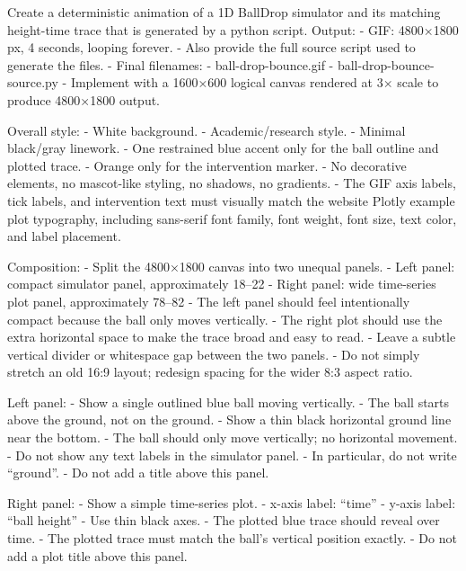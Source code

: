 \documentclass[11pt]{article}
\begin{document}
\begin{DocCode}
Create a deterministic animation of a 1D BallDrop simulator and its matching height-time trace that is generated by a python script.
 Output:
  - GIF: 4800×1800 px, 4 seconds, looping forever.
  - Also provide the full source script used to generate the files.
  - Final filenames:
    - ball-drop-bounce.gif
    - ball-drop-bounce-source.py
  - Implement with a 1600×600 logical canvas rendered at 3× scale to produce 4800×1800 output.

  Overall style:
  - White background.
  - Academic/research style.
  - Minimal black/gray linework.
  - One restrained blue accent only for the ball outline and plotted trace.
  - Orange only for the intervention marker.
  - No decorative elements, no mascot-like styling, no shadows, no gradients.
  - The GIF axis labels, tick labels, and intervention text must visually match the website
    Plotly example plot typography, including sans-serif font family, font weight, font size,
    text color, and label placement.

  Composition:
  - Split the 4800×1800 canvas into two unequal panels.
  - Left panel: compact simulator panel, approximately 18–22%
  - Right panel: wide time-series plot panel, approximately 78–82%
  - The left panel should feel intentionally compact because the ball only moves vertically.
  - The right plot should use the extra horizontal space to make the trace broad and easy to read.
  - Leave a subtle vertical divider or whitespace gap between the two panels.
  - Do not simply stretch an old 16:9 layout; redesign spacing for the wider 8:3 aspect ratio.

  Left panel:
  - Show a single outlined blue ball moving vertically.
  - The ball starts above the ground, not on the ground.
  - Show a thin black horizontal ground line near the bottom.
  - The ball should only move vertically; no horizontal movement.
  - Do not show any text labels in the simulator panel.
  - In particular, do not write “ground”.
  - Do not add a title above this panel.

  Right panel:
  - Show a simple time-series plot.
  - x-axis label: “time”
  - y-axis label: “ball height”
  - Use thin black axes.
  - The plotted blue trace should reveal over time.
  - The plotted trace must match the ball’s vertical position exactly.
  - Do not add a plot title above this panel.


\end{DocCode}
\end{document}
